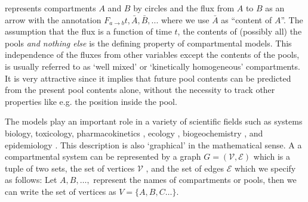  represents compartments $A$ and $B$ by circles and the flux from $A$ to $B$ as an arrow with the annotation $F_{a\rightarrow b}{t,\bar{A},\bar{B},...}$   
where we use $\bar{A}$ as ``content of $A$''. 
The assumption that the flux is a function of time $t$, the contents of (possibly all) the pools \emph{and nothing else} is the defining property of compartmental models.  
This independence of the fluxes from other variables except the contents of the pools, is usually referred to as `well mixed' or `kinetically homogeneous' compartments. 
It is very attractive since it implies that future pool contents can be predicted from the present pool contents alone, without the necessity to track other properties like e.g. the position inside the pool.  

The models play an important role
in a variety of scientific fields such as systems biology,
toxicology, pharmacokinetics \cite{Anderson1983} , ecology
\cite{Eriksson1971ARoEaS, Rodhe1979Tellus, Matis1979, Manzoni2009SBB},
biogeochemistry
\cite{Manzoni2009SBB, Sierra2015EM}, and epidemiology \cite{Jacquez1993SIAM}.
This description is also `graphical' in the mathematical sense. 
A a compartmental system can be represented by a graph $G=(\mathcal{V}, \mathcal{E})$  which is a tuple of two sets, the set of vertices $\mathcal{V}$ , and the
set of edges $\mathcal{E}$ which we specify as follows: 
Let $A,B,\dots,$ represent the names of compartments or pools, then we can write the set of vertices as $V=\{A,B,C\dots\}$. 

